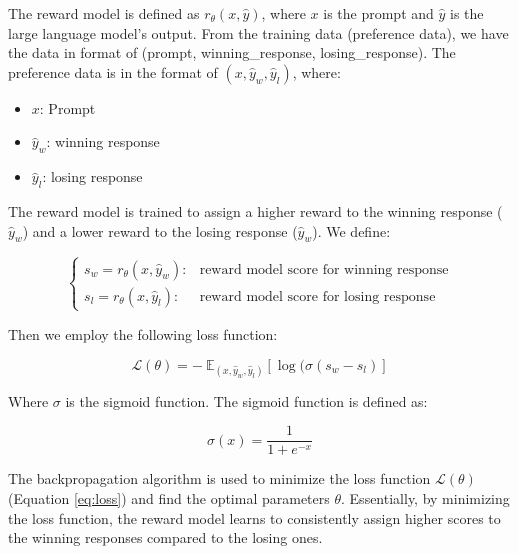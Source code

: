 The reward model is defined as $r_{\theta}(x,\hat{y})$, where $x$ is the prompt and $\hat{y}$ 
is the large language model's output. From the training data (preference data), we have the data in format of (prompt, winning\_response, losing\_response). The preference data is in the format of $(x, \hat{y}_w, \hat{y}_l)$, where:
\begin{itemize}
    \item $x$: Prompt
    \item $\hat{y}_w$: winning response
    \item $\hat{y}_l$: losing response
\end{itemize}

The reward model is trained to assign a higher reward to the winning response ($\hat{y}_w$) and a lower reward to the losing response ($\hat{y}_w$). We define:

\begin{equation}
  \begin{cases}
        s_w=r_{\theta}(x, \hat{y}_w): & \text{reward model score for winning response} \\
        s_l=r_{\theta}(x, \hat{y}_l): & \text{reward model score for losing response}
    \end{cases}
\end{equation}

Then we employ the following loss function:

\begin{equation}
    \mathcal{L}(\theta) = - \ \mathbb{E}_{(x, \hat{y}_w, \hat{y}_l)} \left[ \log(
    \sigma(s_w - s_l) \right] \label{eq:loss}
\end{equation}

Where $\sigma$ is the sigmoid function. The sigmoid function is defined as:

\begin{equation}
    \sigma(x) = \frac{1}{1 + e^{-x}}
\end{equation}

The backpropagation algorithm is used to minimize the loss function 
$\mathcal{L}(\theta)$ (Equation \ref{eq:loss}) and find the optimal parameters $\theta$. Essentially, by minimizing the loss function, the reward model learns to consistently assign higher scores to the winning responses compared to the losing ones.